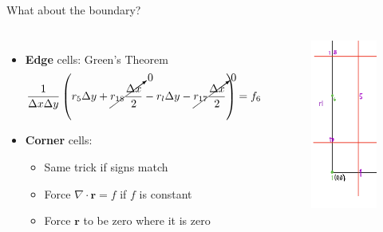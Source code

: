 \documentclass{beamer}
\begin{document}
    \begin{frame}{What about the boundary?}
    \begin{columns}
        \begin{itemize}
            \item \textbf{Edge} cells: Green's Theorem
            \begin{equation*}
                \frac{1}{\Delta x \Delta y} \left(r_5 \Delta y + \cancelto{0}{r_{18} \frac{\Delta x}{2}} - r_l \Delta y - \cancelto{0}{r_{17} \frac{\Delta x}{2}}\right) = f_6
            \end{equation*}
            \item \textbf{Corner} cells: 
            \begin{itemize}
                \item Same trick if signs match
                \item Force $\nabla \cdot \bm{r} = f$ if $f$ is constant
                \item Force $\bm{r}$ to be zero where it is zero
            \end{itemize}
        \end{itemize}
        \begin{figure}
            \includegraphics[scale=0.3]{edge.png}
        \end{figure}
    \end{columns}
        
    \end{frame}
\end{document}
